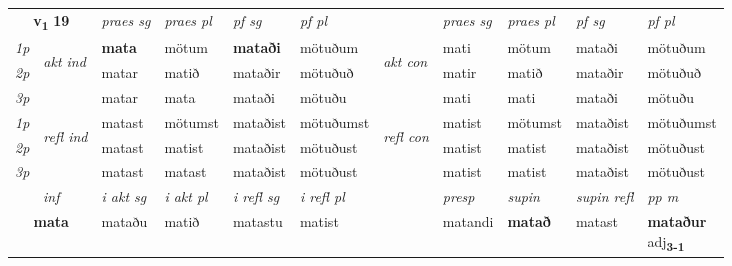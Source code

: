 \noindent
\begin{tabular}{lllllllllll} \toprule
\multicolumn{2}{c}{\textbf{v{\textsubscript{1}}} \Large{\textbf{19}}}  &  \textit{praes sg}  & \textit{praes pl}  &\textit{ pf sg} & \textit{pf pl} &  &  \textit{praes sg}  & \textit{praes pl}  & \textit{pf sg} & \textit{pf pl } \\*
	\cmidrule{3-6} \cmidrule{8-11}
 {\textit{1p}} & \multirow{3}{*}{\begin{turn}{90}\textit{akt ind}\end{turn}} & \textbf{mata} & mötum & \textbf{mataði} & mötuðum & \multirow{3}{*}{\begin{turn}{90}\textit{akt con}\end{turn}} &mati & mötum & mataði & mötuðum\\*
 {\textit{2p}} &  &  matar  & matið & mataðir & mötuðuð & & matir & matið & mataðir & mötuðuð \\*
{\textit{3p}} &  & matar & mata & mataði & mötuðu & & mati & mati& mataði & mötuðu \\*
\cmidrule{3-6} \cmidrule{8-11}
 {\textit{1p}} & \multirow{3}{*}{\begin{turn}{90}\textit{refl ind}\end{turn}}  & matast & mötumst & mataðist & mötuðumst & \multirow{3}{*}{\begin{turn}{90}\textit{refl con}\end{turn}}  &matist & mötumst & mataðist & mötuðumst \\*
 {\textit{2p}} &  & matast & matist & mataðist & mötuðust & &matist & matist & mataðist & mötuðust \\*
 {\textit{3p}}  & & matast & matast & mataðist & mötuðust & & matist & matist& mataðist & mötuðust \\*
\cmidrule{3-6} \cmidrule{8-11}

   \multicolumn{2}{c}{\textit{inf}}  & \textit{i akt sg} & \textit{i akt pl} & \textit{i refl sg} & \textit{i refl pl} && \textit{presp} & \textit{supin} & \textit{supin refl} & \textit{pp m} \\*
  \multicolumn{2}{c}{\textbf{mata}} & mataðu  & matið & matastu & matist && matandi &  \textbf{matað} & matast & \specialcell{\textbf{mataður} \\ adj\textbf{\textsubscript{3-1}}} \\*
\end{tabular}


